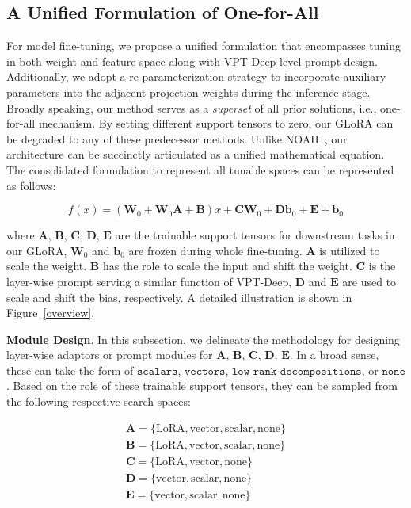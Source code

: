 \subsection{A Unified Formulation of One-for-All} \label{method}

For model fine-tuning, we propose a unified formulation that encompasses tuning in both weight and feature space along with VPT-Deep level prompt design. Additionally, we adopt a re-parameterization strategy to incorporate auxiliary parameters into the adjacent projection weights during the inference stage. Broadly speaking, our method serves as a {\em superset} of all prior solutions, i.e., one-for-all mechanism. By setting different support tensors to zero, our GLoRA can be degraded to any of these predecessor methods. Unlike NOAH~\citep{zhang2022neural}, our architecture can be succinctly articulated as a unified mathematical equation. The consolidated formulation to represent all tunable spaces can be represented as follows:

\begin{equation} \label{eq:uni}
f(x)=\left(\mathbf{W}_{0}+\mathbf{W}_{0} \mathbf{A}+\mathbf{B}\right) x+\mathbf{C} \mathbf{W}_{0}+\mathbf{D} \mathbf{b}_{0}+\mathbf{E}+\mathbf{b}_{0} 
\end{equation}

where $\mathbf{A}$, $\mathbf{B}$, $\mathbf{C}$, $\mathbf{D}$, $\mathbf{E}$ are the trainable support tensors for downstream tasks in our GLoRA, $\mathbf{W}_{0}$ and $\mathbf{b}_{0}$ are frozen during whole fine-tuning. $\mathbf{A}$ is utilized to scale the weight. $\mathbf{B}$ has the role to scale the input and shift the weight. $\mathbf{C}$ is the layer-wise prompt serving a similar function of VPT-Deep, $\mathbf{D}$ and $\mathbf{E}$ are used to scale and shift the bias, respectively. A detailed illustration is shown in Figure~\ref{overview}.

{\bf Module Design}. In this subsection, we delineate the methodology for designing layer-wise adaptors or prompt modules for $\mathbf{A}$, $\mathbf{B}$, $\mathbf{C}$, $\mathbf{D}$, $\mathbf{E}$. In a broad sense, these can take the form of $\texttt{scalars}$, $\texttt{vectors}$, $\texttt{low-rank decompositions}$, or $\texttt{none}$. Based on the role of these trainable support tensors, they can be sampled from the following respective search spaces:

\begin{equation}
\begin{array}{ll}
\mathbf{A} = \{\mathrm{LoRA}, \mathrm{vector}, \mathrm{scalar}, \mathrm{none}\} \\ 
\mathbf{B} = \{\mathrm{LoRA}, \mathrm{vector}, \mathrm{scalar}, \mathrm{none}\} \\
\mathbf{C} = \{\mathrm{LoRA}, \mathrm{vector}, \mathrm{none} \} \\ 
\mathbf{D} = \{\mathrm{vector}, \mathrm{scalar}, \mathrm{none}\} \\ 
\mathbf{E} = \{\mathrm{vector}, \mathrm{scalar}, \mathrm{none}\} 
\end{array}
\label{support_tensor}
\end{equation}

